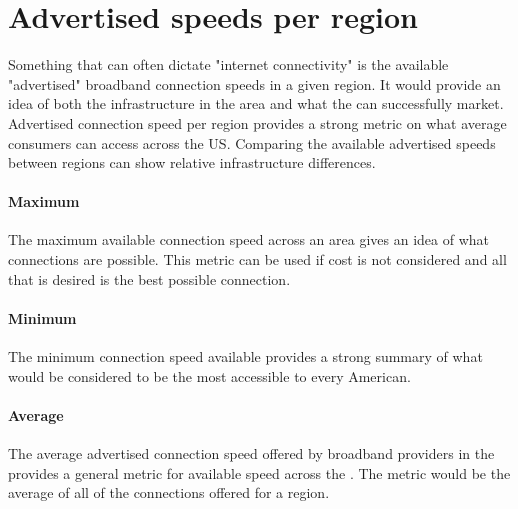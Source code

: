 \section{Advertised speeds per region}
Something that can often dictate "internet connectivity" is the available "advertised" broadband connection speeds in a given region. It would provide an idea of both the infrastructure in the area and what the \isp can successfully market. Advertised connection speed per region provides a strong metric on what average consumers can access across the US. Comparing the available advertised speeds between regions can show relative infrastructure differences.

\paragraph{Maximum}
The maximum available connection speed across an area gives an idea of what connections are possible. This metric can be used if cost is not considered and all that is desired is the best possible connection.

\paragraph{Minimum}
The minimum connection speed available provides a strong summary of what would be considered to be the most accessible to every American.

\paragraph{Average}
The average advertised connection speed offered by broadband providers in the \us provides a general metric for available speed across the \us. The metric would be the average of all of the connections offered for a region.


